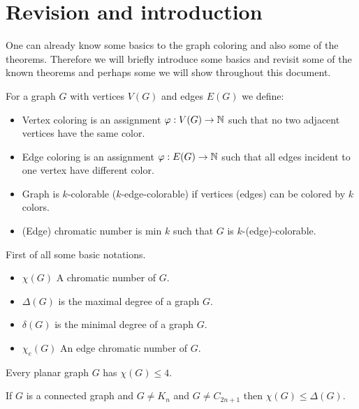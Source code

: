 \chapter{Revision and introduction}

One can already know some basics to the graph coloring and also some of the theorems. Therefore we will briefly introduce some basics and revisit some of the known theorems and perhaps some we will show throughout this document.

\begin{defn}
	For a graph $G$ with vertices $V(G)$ and edges $E(G)$ we define:
	
	\begin{itemize}
		\item Vertex coloring is an assignment $\varphi : V(G) \to \mathbb{N}$ such that no two adjacent vertices have the same color.
		\item Edge coloring is an assignment $\varphi: E(G) \to \mathbb{N}$ such that all edges incident to one vertex have different color.
		\item Graph is $k$-colorable ($k$-edge-colorable) if vertices (edges) can be colored by $k$ colors.
		\item (Edge) chromatic number is min $k$ such that $G$ is $k$-(edge)-colorable.
	\end{itemize}
\end{defn}

\begin{notation}
	First of all some basic notations.
	
	\begin{itemize}
		\item $\chi(G)$ A chromatic number of $G$.
		\item $\Delta(G)$ is the maximal degree of a graph $G$.
		\item $\delta(G)$ is the minimal degree of a graph $G$.
		\item $\chi_e(G)$ An edge chromatic number of $G$.
	\end{itemize}
\end{notation}

\begin{thm}
	Every planar graph $G$ has $\chi (G) \leq 4$.
\end{thm}

\begin{thm}[Brooks]
	If $G$ is a connected graph and $G \neq K_n$ and $G \neq C_{2n+1}$ then $\chi(G) \leq \Delta(G)$.
\end{thm}

